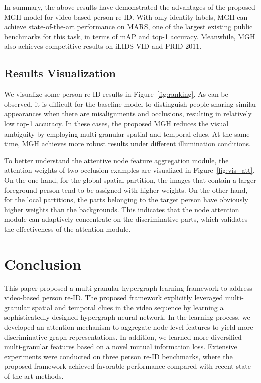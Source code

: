 \documentclass[10pt,twocolumn,letterpaper]{article}
\begin{document}
In summary, the above results have demonstrated the advantages of the proposed MGH model for video-based person re-ID. With only identity labels, MGH can achieve state-of-the-art performance on MARS, one of the largest existing public benchmarks for this task, in terms of mAP and top-1 accuracy. Meanwhile, MGH also achieves competitive results on iLIDS-VID and PRID-2011.

\subsection{Results Visualization}
We visualize some person re-ID results in Figure~\ref{fig:ranking}. As can be observed, it is difficult for the baseline model to distinguish people sharing similar appearances when there are misalignments and occlusions, resulting in relatively low top-1 accuracy. In these cases, the proposed MGH reduces the visual ambiguity by employing multi-granular spatial and temporal clues. At the same time, MGH achieves more robust results under different illumination conditions.


To better understand the attentive node feature aggregation module, the attention weights of two occlusion examples are visualized in Figure~\ref{fig:vis_att}. On the one hand, for the global spatial partition, the images that contain a larger foreground person tend to be assigned with higher weights. On the other hand, for the local partitions, the parts belonging to the target person have obviously higher weights than the backgrounds. This indicates that the node attention module can adaptively concentrate on the discriminative parts, which validates the effectiveness of the attention module.

\section{Conclusion}
This paper proposed a multi-granular hypergraph learning framework to address video-based person re-ID. The proposed framework explicitly leveraged multi-granular spatial and temporal clues in the video sequence by learning a sophisticatedly-designed hypergraph neural network. In the learning process, we developed an attention mechanism to aggregate node-level features to yield more discriminative graph representations. In addition, we learned more diversified multi-granular features based on a novel mutual information loss. Extensive experiments were conducted on three person re-ID benchmarks, where the proposed framework achieved favorable performance compared with recent state-of-the-art methods.



{\small


}
\end{document}

